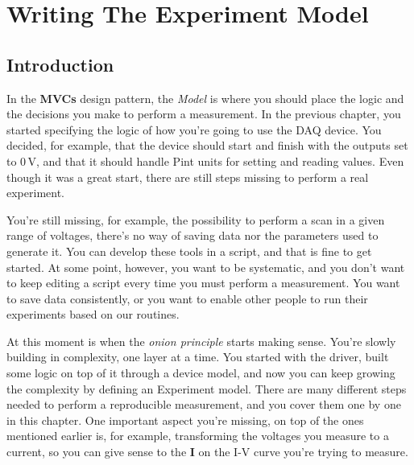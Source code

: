 \chapter{Writing The Experiment Model}\label{ch:experiment-model}

\section{Introduction}\label{sec:experiment-model-introduction}
In the \textbf{MVCs} design pattern, the \emph{Model} is where you should place the logic and the decisions you make to perform a measurement. In the previous chapter, you started specifying the logic of how you're going to use the DAQ device. You decided, for example, that the device should start and finish with the outputs set to $0\,\textrm{V}$, and that it should handle Pint units for setting and reading values. Even though it was a great start, there are still steps missing to perform a real experiment.

You're still missing, for example, the possibility to perform a scan in a given range of voltages, there's no way of saving data nor the parameters used to generate it. You can develop these tools in a script, and that is fine to get started. At some point, however, you want to be systematic, and you don't want to keep editing a script every time you must perform a measurement. You want to save data consistently, or you want to enable other people to run their experiments based on our routines.

At this moment is when the \emph{onion principle} starts making sense. You're slowly building in complexity, one layer at a time. You started with the driver, built some logic on top of it through a device model, and now you can keep growing the complexity by defining an Experiment model. There are many different steps needed to perform a reproducible measurement, and you cover them one by one in this chapter. One important aspect you're missing, on top of the ones mentioned earlier is, for example, transforming the voltages you measure to a current, so you can give sense to the \textbf{I} on the I-V curve you're trying to measure.


